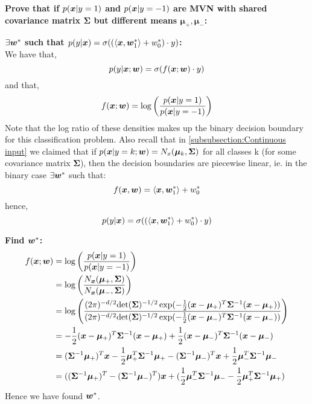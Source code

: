 \begin{appendices}
\begin{question}
    \textbf{Prove that if $p(\bm{x}|y=1)$ and $p(\bm{x}|y=-1)$ are MVN with shared covariance matrix $\bm{\Sigma}$ but different means $\bm{\mu_{+}}, \bm{\mu_{-}}$:}
    \begin{subquestion}
        \textbf{$\exists \bm{w}^{*}$ such that $p(y|\bm{x})=\sigma((\langle\bm{x},\bm{w}^{*}_{1}\rangle + w_{0}^{*}) \cdot y)$:}\\
        We have that,
        \begin{equation}
            p(y|\bm{x};\bm{w}) = \sigma(f(\bm{x};\bm{w}) \cdot y) 
        \end{equation}
        and that,
        \begin{equation}
            f(\bm{x};\bm{w}) = \log \left(\frac{p(\bm{x}|y=1)}{p(\bm{x}|y=-1)}\right)
        \end{equation}
        Note that the log ratio of these densities makes up the binary decision boundary for this classification problem. Also recall that in \cref{subsubsection:Continuous input} we claimed that if $p(\bm{x}|y=k;\bm{w})=N_{x}(\bm{\mu}_{k},\bm{\Sigma})$ for all classes k (for some covariance matrix $\bm{\Sigma}$), then the decision boundaries are piecewise linear, ie. in the binary case $\exists \bm{w}^{*}$ such that:
        \begin{equation}
            f(\bm{x},\bm{w}) = \langle \bm{x},\bm{w}^{*}_{1} \rangle + w_{0}^{*}
        \end{equation}
        hence,
        \begin{equation}
            p(y|\bm{x}) = \sigma((\langle\bm{x},\bm{w}^{*}_{1} \rangle + w_{0}^{*}) \cdot y)
        \end{equation}
    \end{subquestion}
    \begin{subquestion}
        \textbf{Find $\bm{w}^{*}$:}\\
        \begin{align}
            f(\bm{x};\bm{w}) &{} = \log \left(\frac{p(\bm{x}|y=1)}{p(\bm{x}|y=-1)}\right) \\ 
            &= \log \left(\frac{N_{\bm{x}}(\bm{\mu}_{+}, \bm{\Sigma})}{N_{\bm{x}}(\bm{\mu}_{-}, \bm{\Sigma})}\right) \\
            &= \log \left(\frac{(2\pi)^{-d/2} \text{det}(\bm{\Sigma})^{-1/2} \exp(-\frac{1}{2} (\bm{x} - \bm{\mu}_{+})^{T} \bm{\Sigma}^{-1} (\bm{x} - \bm{\mu}_{+}))}
            {(2\pi)^{-d/2} \text{det}(\bm{\Sigma})^{-1/2} \exp(-\frac{1}{2} (\bm{x} - \bm{\mu}_{-})^{T} \bm{\Sigma}^{-1} (\bm{x} - \bm{\mu}_{-}))}\right) \\
            &= -\frac{1}{2} (\bm{x} - \bm{\mu}_{+})^{T} \bm{\Sigma}^{-1} (\bm{x} - \bm{\mu}_{+}) +\frac{1}{2} (\bm{x} - \bm{\mu}_{-})^{T} \bm{\Sigma}^{-1} (\bm{x} - \bm{\mu}_{-}) \\ 
            &= (\bm{\Sigma}^{-1} \bm{\mu}_{+})^{T} \bm{x} -\frac{1}{2} \bm{\mu}_{+}^{T} \bm{\Sigma}^{-1} \bm{\mu}_{+} 
            - (\bm{\Sigma}^{-1} \bm{\mu}_{-})^{T} \bm{x} +\frac{1}{2} \bm{\mu}_{-}^{T} \bm{\Sigma}^{-1} \bm{\mu}_{-} \\
            &= ((\bm{\Sigma}^{-1} \bm{\mu}_{+})^{T} - (\bm{\Sigma}^{-1} \bm{\mu}_{-})^{T}) \bm{x} 
            + ( \frac{1}{2} \bm{\mu}_{-}^{T} \bm{\Sigma}^{-1} \bm{\mu}_{-} -\frac{1}{2} \bm{\mu}_{+}^{T} \bm{\Sigma}^{-1} \bm{\mu}_{+} )
        \end{align}
        Hence we have found $\bm{w}^{*}$.
    \end{subquestion}
\end{question}


\end{appendices}
